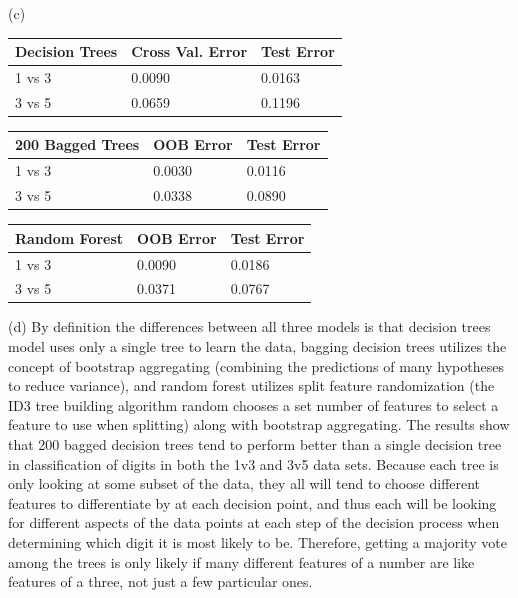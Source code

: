 \documentclass[12pt,letterpaper]{article}
\begin{document}
\begin{description}
	\item (c) 
\begin{table}[h]
\begin{tabular}{|l|l|l|l|}
\hline
\textbf{Decision Trees} & \multicolumn{2}{l|}{\textbf{Cross Val. Error}} & \textbf{Test Error} \\ \hline
1 vs 3                  & \multicolumn{2}{l|}{0.0090}                   & 0.0163             \\ \hline
3 vs 5                  & \multicolumn{2}{l|}{0.0659}                   & 0.1196	         \\ \hline
\end{tabular}
\end{table}
\begin{table}[h]
\begin{tabular}{|l|l|l|l|}
\hline
\textbf{200 Bagged Trees} & \multicolumn{2}{l|}{\textbf{OOB Error}} & \textbf{Test Error} \\ \hline
1 vs 3                    & \multicolumn{2}{l|}{0.0030}             & 0.0116              \\ \hline
3 vs 5                    & \multicolumn{2}{l|}{0.0338}             & 0.0890              \\ \hline
\end{tabular}
\end{table}
\begin{table}[h]
\begin{tabular}{|l|l|l|l|}
\hline
\textbf{Random Forest} & \multicolumn{2}{l|}{\textbf{OOB Error}} & \textbf{Test Error} \\ \hline
1 vs 3                    & \multicolumn{2}{l|}{0.0090}             & 0.0186              \\ \hline
3 vs 5                    & \multicolumn{2}{l|}{0.0371}             & 0.0767              \\ \hline
\end{tabular}
\end{table}
	\item (d) By definition the differences between all three models is that decision trees model uses only a single tree to learn the data, bagging decision trees utilizes the concept of bootstrap aggregating (combining the predictions of many hypotheses to reduce variance), and random forest utilizes split feature randomization (the ID3 tree building algorithm random chooses a set number of features to select a feature to use when splitting) along with bootstrap aggregating. The results show that 200 bagged decision trees tend to perform better than a single decision tree in classification of digits in both the 1v3 and 3v5 data sets. Because each tree is only looking at some subset of the data, they all will tend to choose different features to differentiate by at each decision point, and thus each will be looking for different aspects of the data points at each step of the decision process when determining which digit it is most likely to be. Therefore, getting a majority vote among the trees is only likely if many different features of a number are like features of a three, not just a few particular ones.

\end{description}
\end{document}
